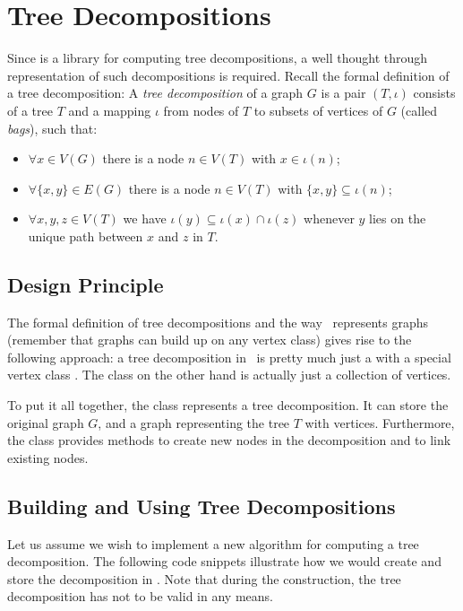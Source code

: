 \documentclass[a4paper, ukenglish, twoside, openright]{jdrasilmanual}
\begin{document}
\chapter{Tree Decompositions}\label{chapter:treedecompositions}
Since \Jdrasil{} is a library for computing tree decompositions, a
well thought through representation of such decompositions is
required. Recall the formal definition of a tree decomposition: A
\emph{tree decomposition} of a graph $G$ is a pair $(T,\iota)$
consists of a tree $T$ and a mapping $\iota$ from nodes of $T$ to
subsets of vertices of $G$ (called \emph{bags}), such that:
\begin{itemize}
  \item $\forall x\in V(G)$ there is a node $n\in V(T)$ with $x\in\iota(n)$;
  \item $\forall \{x,y\}\in E(G)$ there is a node $n\in V(T)$ with $\{x,y\}\subseteq\iota(n)$;
  \item $\forall x,y,z\in V(T)$ we have $\iota(y)\subseteq \iota(x)\cap\iota(z)$
whenever $y$ lies on the unique path between $x$ and $z$ in $T$.
\end{itemize}

\section{Design Principle}
The formal definition of tree decompositions and the way \Jdrasil\
represents graphs (remember that graphs can build up on any vertex
class) gives rise to the following approach: a tree decomposition in
\Jdrasil\ is pretty much just a \JClass{Graph} with a special vertex
class . The \JClass{Bag} class on the other hand is actually just a
collection of vertices.

To put it all together, the class 
represents a tree decomposition. It can store the original graph $G$,
and a graph representing the tree $T$ with \JClass{Bag}
vertices. Furthermore, the class  provides
methods to create new nodes in the decomposition and to link existing nodes.

\section{Building and Using Tree Decompositions}
Let us assume we wish to implement a new algorithm for computing a
tree decomposition. The following code snippets illustrate how we would
create and store the decomposition in \Jdrasil. Note that during the
construction, the tree decomposition has not to be valid in any means.
\end{document}
